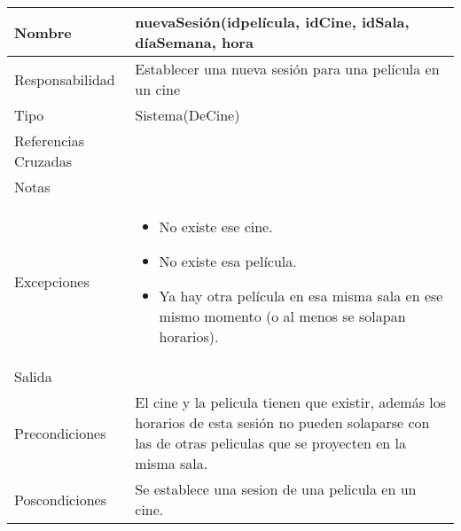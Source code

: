 \documentclass{article}
\begin{document}
\begin{table}[h]
\begin{tabular}{|l|l|l|l|l|l|}
\hline
\multicolumn{2}{|p{3cm}|}{Nombre} & \multicolumn{4}{p{10cm}|}{\textbf{nuevaSesión(idpelícula, idCine, idSala, díaSemana, hora}}\\
\hline
\multicolumn{2}{|p{3cm}|}{Responsabilidad} & \multicolumn{4}{p{10cm}|}{Establecer una nueva sesión para una película en un cine} \\
\hline
\multicolumn{2}{|p{3cm}|}{Tipo} & \multicolumn{4}{p{10cm}|}{Sistema(DeCine)} \\
\hline
\multicolumn{2}{|p{3cm}|}{Referencias Cruzadas} & \multicolumn{4}{p{10cm}|}{} \\
\hline
\multicolumn{2}{|p{3cm}|}{Notas} & \multicolumn{4}{p{10cm}|}{} \\
\hline
\multicolumn{2}{|p{3cm}|}{Excepciones} & \multicolumn{4}{p{10cm}|}{\begin{itemize}
\item No existe ese cine.
\item No existe esa película.
\item Ya hay otra película en esa misma sala en ese mismo momento (o al menos se solapan horarios).
\end{itemize}} \\
\hline
\multicolumn{2}{|p{3cm}|}{Salida} & \multicolumn{4}{p{10cm}|}{} \\
\hline
\multicolumn{2}{|p{3cm}|}{Precondiciones} & \multicolumn{4}{p{10cm}|}{El cine y la pelicula tienen que existir, además los horarios de esta sesión no pueden solaparse con las de otras peliculas que se proyecten en la misma sala.} \\
\hline
\multicolumn{2}{|p{3cm}|}{Poscondiciones} & \multicolumn{4}{p{10cm}|}{Se establece una sesion de una pelicula en un cine.} \\
\hline
\end{tabular}
\end{table}
\end{document}
